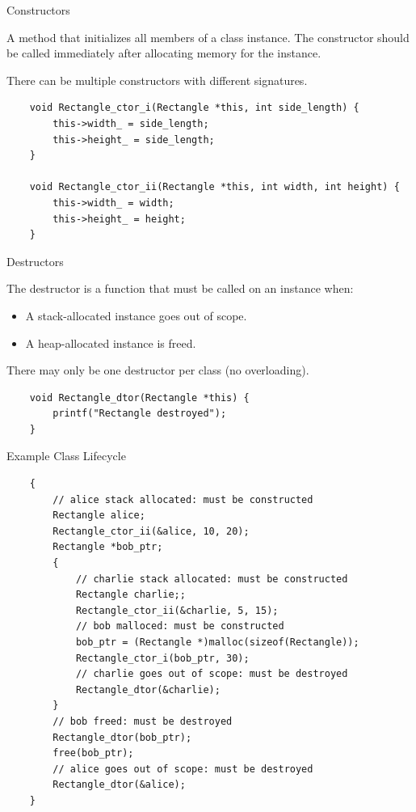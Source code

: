 \begin{frame}[fragile]{Constructors}
  \begin{sqt:definition}
    A method that initializes all members of a class instance.
    The constructor should be called immediately after allocating memory for the instance.
  \end{sqt:definition}

  There can be multiple constructors with different signatures.

  \begin{verbatim}
    void Rectangle_ctor_i(Rectangle *this, int side_length) {
        this->width_ = side_length;
        this->height_ = side_length;
    }

    void Rectangle_ctor_ii(Rectangle *this, int width, int height) {
        this->width_ = width;
        this->height_ = height;
    }
  \end{verbatim}
\end{frame}

\begin{frame}[fragile]{Destructors}
  \begin{sqt:definition}
    The destructor is a function that must be called on an instance when:
    \begin{itemize}
      \item A stack-allocated instance goes out of scope.
      \item A heap-allocated instance is freed.
    \end{itemize}
  \end{sqt:definition}

  There may only be one destructor per class (no overloading).

  \begin{verbatim}
    void Rectangle_dtor(Rectangle *this) {
        printf("Rectangle destroyed");
    }
  \end{verbatim}
\end{frame}

\begin{frame}[fragile]{Example Class Lifecycle}
  \begin{verbatim}
    {
        // alice stack allocated: must be constructed
        Rectangle alice;
        Rectangle_ctor_ii(&alice, 10, 20);
        Rectangle *bob_ptr;
        {
            // charlie stack allocated: must be constructed
            Rectangle charlie;;
            Rectangle_ctor_ii(&charlie, 5, 15);
            // bob malloced: must be constructed
            bob_ptr = (Rectangle *)malloc(sizeof(Rectangle));
            Rectangle_ctor_i(bob_ptr, 30);
            // charlie goes out of scope: must be destroyed
            Rectangle_dtor(&charlie);
        }
        // bob freed: must be destroyed
        Rectangle_dtor(bob_ptr);
        free(bob_ptr);
        // alice goes out of scope: must be destroyed
        Rectangle_dtor(&alice);
    }
  \end{verbatim}
\end{frame}

